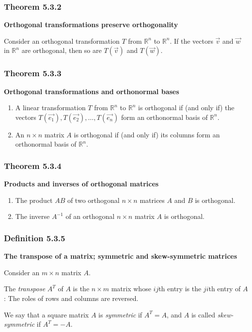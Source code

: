 \documentclass{report}
\begin{document}
\subsubsection*{Theorem 5.3.2}
\par\noindent\textbf{Orthogonal transformations preserve orthogonality}
\par\noindent Consider an orthogonal transformation $T$ from $\mathbb{R}^{n}$ to $\mathbb{R}^{n}$. If the vectors $\vec{v}$ and $\vec{w}$ in $\mathbb{R}^{n}$ are orthogonal, then so are $T(\vec{v})$ and $T(\vec{w})$.
\subsubsection*{Theorem 5.3.3}
\par\noindent\textbf{Orthogonal transformations and orthonormal bases}
\renewcommand{\labelenumi}{\textbf{\alph{enumi}.}}
\begin{enumerate}
\item A linear transformation $T$ from $\mathbb{R}^{n}$ to $\mathbb{R}^{n}$ is orthogonal if (and only if) the vectors $T(\vec{e_{1}}),T(\vec{e_{2}}),\ldots{},T(\vec{e_{n}})$ form an orthonormal basis of $\mathbb{R}^{n}$.
\item An $n\times{}n$ matrix $A$ is orthogonal if (and only if) its columns form an orthonormal basis of $\mathbb{R}^{n}$.
\end{enumerate}
\subsubsection*{Theorem 5.3.4}
\par\noindent\textbf{Products and inverses of orthogonal matrices}
\renewcommand{\labelenumi}{\textbf{\alph{enumi}.}}
\begin{enumerate}
\item The product $AB$ of two orthogonal $n\times{}n$ matrices $A$ and $B$ is orthogonal.
\item The inverse $A^{-1}$ of an orthogonal $n\times{}n$ matrix $A$ is orthogonal.
\end{enumerate}
\subsubsection*{Definition 5.3.5}
\par\noindent\textbf{The transpose of a matrix; symmetric and skew-symmetric matrices}
\par\noindent Consider an $m\times{}n$ matrix $A$.
\par\noindent The \textit{transpose} $A^{T}$ of $A$ is the $n\times{}m$ matrix whose $ij$th entry is the $ji$th entry of $A$: The roles of rows and columns are reversed.
\par\noindent We say that a square matrix $A$ is \textit{symmetric} if $A^{T}=A$, and $A$ is called \textit{skew-symmetric} if $A^{T}=-A$.
\end{document}
